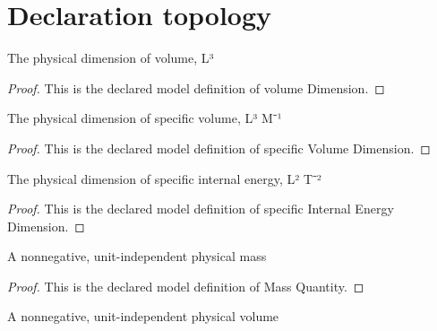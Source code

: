 \section{Declaration topology}
\begin{definition}
  \label{def:physics:phyx-mini-0451:phyxminiproblems-problemphyxmini0451-volumedimension}
  The physical dimension of volume, L³
\end{definition}
\begin{proof}
  This is the declared model definition of volume Dimension.
\end{proof}
\begin{definition}
  \label{def:physics:phyx-mini-0451:phyxminiproblems-problemphyxmini0451-specificvolumedimension}
  The physical dimension of specific volume, L³ M⁻¹
\end{definition}
\begin{proof}
  This is the declared model definition of specific Volume Dimension.
\end{proof}
\begin{definition}
  \label{def:physics:phyx-mini-0451:phyxminiproblems-problemphyxmini0451-specificinternalenergydimension}
  The physical dimension of specific internal energy, L² T⁻²
\end{definition}
\begin{proof}
  This is the declared model definition of specific Internal Energy Dimension.
\end{proof}
\begin{definition}
  \label{def:physics:phyx-mini-0451:phyxminiproblems-problemphyxmini0451-massquantity}
  A nonnegative, unit-independent physical mass
\end{definition}
\begin{proof}
  This is the declared model definition of Mass Quantity.
\end{proof}
\begin{definition}
  \label{def:physics:phyx-mini-0451:phyxminiproblems-problemphyxmini0451-volumequantity}
  A nonnegative, unit-independent physical volume
\end{definition}
